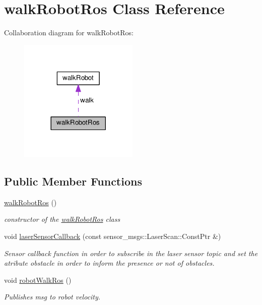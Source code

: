 \hypertarget{classwalkRobotRos}{}\section{walk\+Robot\+Ros Class Reference}
\label{classwalkRobotRos}


Collaboration diagram for walk\+Robot\+Ros\+:
\nopagebreak
\begin{figure}[H]
\begin{center}
\leavevmode
\includegraphics[width=161pt]{classwalkRobotRos__coll__graph}
\end{center}
\end{figure}
\subsection*{Public Member Functions}
\begin{DoxyCompactItemize}
\item 
\hyperlink{classwalkRobotRos_a642a5690f6c6edfcd6f0470cc59e1197}{walk\+Robot\+Ros} ()
\begin{DoxyCompactList}\small\item\em constructor of the \hyperlink{classwalkRobotRos}{walk\+Robot\+Ros} class \end{DoxyCompactList}\item 
void \hyperlink{classwalkRobotRos_ae8eb0d47c19b806f46f0bb6e50060de8}{laser\+Sensor\+Callback} (const sensor\+\_\+msgs\+::\+Laser\+Scan\+::\+Const\+Ptr \&)
\begin{DoxyCompactList}\small\item\em Sensor callback function in order to subscribe in the laser sensor topic and set the atribute obstacle in order to inform the presence or not of obstacles. \end{DoxyCompactList}\item 
void \hyperlink{classwalkRobotRos_a5fc8da4343df09e338068740bdf72b8a}{robot\+Walk\+Ros} ()
\begin{DoxyCompactList}\small\item\em Publishes msg to robot velocity. \end{DoxyCompactList}\end{DoxyCompactItemize}
